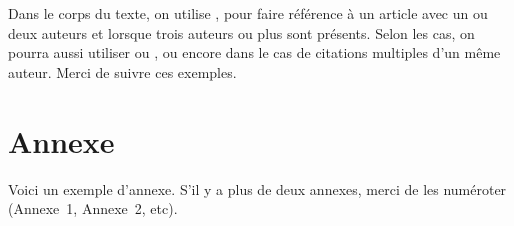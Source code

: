 \documentclass[a4paper,french]{rnti}
\begin{document}
Dans le corps du texte, on utilise \citet{thSau00}, \citet{HolWil90}
pour faire référence à un article avec un ou deux auteurs et
\citet{lioni01} lorsque trois auteurs ou plus sont présents.  Selon
les cas, on pourra aussi utiliser \citep{thSau00} ou
\citep[voir][chapitre 4]{brei:frie:olsh:ston:1984}, ou encore
\citet{quin:1986ID3,quin:1993} dans le cas de citations multiples
d'un même auteur. Merci de suivre ces exemples.






\appendix
\section*{Annexe}

Voici un exemple d'annexe. S'il y a plus de deux annexes, merci de
les numéroter (Annexe~1, Annexe~2, etc).

\Fr
\end{document}
